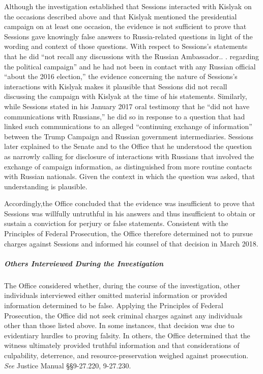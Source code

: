 Although the investigation established that Sessions interacted with Kislyak on the occasions described above and that Kislyak mentioned the presidential campaign on at least one occasion, the evidence is not sufficient to prove that Sessions gave knowingly false answers to Russia-related questions in light of the wording and context of those questions. 
With respect to Sessions's statements that he did ``not recall any discussions with the Russian Ambassador.. . regarding the political campaign'' and he had not been in contact with any Russian official ``about the 2016 election,'' the evidence concerning the nature of Sessions's interactions with Kislyak makes it plausible that Sessions did not recall discussing the campaign with Kislyak at the time of his statements. 
Similarly, while Sessions stated in his January 2017 oral testimony that he ``did not have communications with Russians,'' he did so in response to a question that had linked such communications to an alleged ``continuing exchange of information'' between the Trump Campaign and Russian government intermediaries. 
Sessions later explained to the Senate and to the Office that he understood the question as narrowly calling for disclosure of interactions with Russians that involved the exchange of campaign information, as distinguished from more routine contacts with Russian nationals. 
Given the context in which the question was asked, that understanding is plausible.

Accordingly,the Office concluded that the evidence was insufficient to prove that Sessions was willfully untruthful in his answers and thus insufficient to obtain or sustain a conviction for perjury or false statements. 
Consistent with the Principles of Federal Prosecution, the Office therefore determined not to pursue charges against Sessions and informed his counsel of that decision in March 2018.

\subparagraph{Others Interviewed During the Investigation}
The Office considered whether, during the course of the investigation, other individuals interviewed either omitted material information or provided information determined to be false. 
Applying the Principles of Federal Prosecution, the Office did not seek criminal charges against any individuals other than those listed above. 
In some instances, that decision was due to evidentiary hurdles to proving falsity. 
In others, the Office determined that the witness ultimately provided truthful information and that considerations of culpability, deterrence, and resource-preservation weighed against prosecution.
\textit{See} Justice Manual \S\S 9-27.220, 9-27.230.






